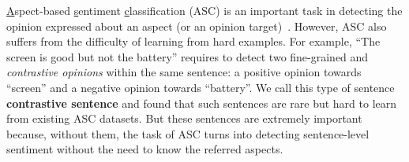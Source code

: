 \underline{A}spect-based \underline{s}entiment \underline{c}lassification (ASC) is an important task in detecting the opinion expressed about an aspect (or an opinion target)~\cite{hu2004mining,liu2015sentiment}.
However, ASC also suffers from the difficulty of learning from hard examples.
For example, ``The screen is good but not the battery'' requires to detect two fine-grained and \textit{contrastive opinions} within the same sentence: a positive opinion towards ``screen'' and a negative opinion towards ``battery''.
We call this type of sentence \textbf{contrastive sentence} and \cite{jiang-etal-2019-challenge} found that such sentences are rare but hard to learn from existing ASC datasets. But these sentences are extremely important because, without them, the task of ASC turns into detecting sentence-level sentiment without the need to know the referred aspects. 

